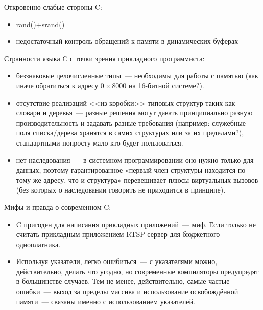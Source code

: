 \documentclass[10pt, a5paper]{article}
\begin{document}
Откровенно слабые стороны C:

\begin{itemize}
  \item rand()+srand()
  \item недостаточный контроль обращений к памяти в динамических буферах
\end{itemize}

Странности языка C с точки зрения прикладного программиста:

\begin{itemize}
  \item беззнаковые целочисленные типы~--- необходимы для работы с памятью (как иначе обратиться к адресу $0\times8000$ на 16-битной системе?).
\end{itemize}

\begin{itemize}
  \item отсутствие реализаций <<из коробки>> типовых структур таких как словари и деревья~--- разные решения могут давать принципиально разную производительность и задавать разные требования (например: служебные поля списка/дерева хранятся в самих структурах или за их пределами?), стандартными попросту мало кто будет пользоваться.
\end{itemize}

\begin{itemize}
  \item нет наследования~--- в системном программировании оно нужно только для данных, поэтому гарантированное «первый член структуры находится по тому же адресу, что и структура» перевешивает плюсы виртуальных вызовов (без которых о наследовании говорить не приходится в принципе).
\end{itemize}

Мифы и правда о современном C:

\begin{itemize}
  \item C пригоден для написания прикладных приложений~--- миф. Если только не считать прикладным приложением RTSP-\linebreak сервер для бюджетного одноплатника.
\end{itemize}

\begin{itemize}
  \item Используя указатели, легко ошибиться~--- с указателями можно, действительно, делать что угодно, но современные компиляторы предупредят в большинстве случаев. Тем не менее, действительно, самые частые ошибки~--- выход за пределы массива и использование освобождённой памяти~--- связаны именно с использованием указателей.
\end{itemize}
\end{document}
